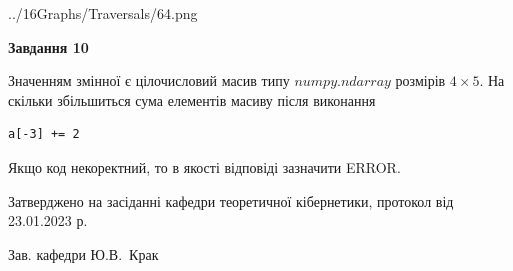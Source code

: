 \documentclass[12pt, ukrainian]{article}
\begin{document}
{\begin {large}
\begin{center}
	{../16Graphs/Traversals/64.png}
\end{center}\par
\newpage

{\begin {center}\textbf{Завдання 10}\end {center}}\par
Значенням змінної  є цілочисловий масив типу $numpy.ndarray$ розмірів $4{\times}5$. На скільки збільшиться сума елементів масиву  після виконання
\begin{verbatim}
a[-3] += 2
\end{verbatim}


Якщо код некоректний, то в якості відповіді зазначити ERROR.\par
\newpage


\end {large}
}
{\smallskip \begin {small} Затверджено на засіданні кафедри теоретичної кібернетики, протокол  від   23.01.2023 р.\par\smallskip\smallskip
{\parbox {6.5 cm}{Зав. кафедри \dotfill Ю.В.~Крак}} \end{small}}
\end{document}
